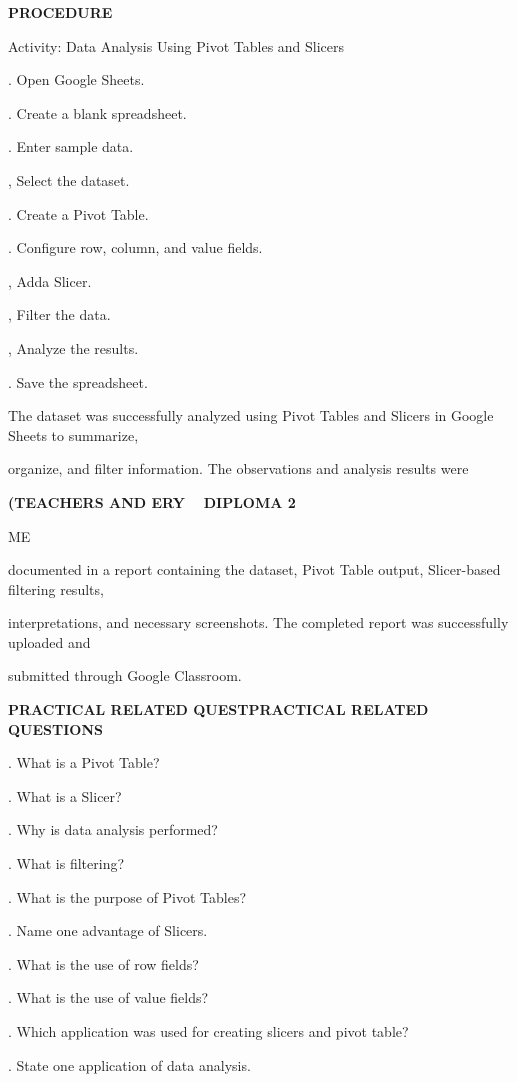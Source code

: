 \documentclass[10pt,a4paper]{article}
\begin{document}
\medskip\noindent\textbf{PROCEDURE}\par
\noindent Activity: Data Analysis Using Pivot Tables and Slicers\par
{}. Open Google Sheets.\par
{}. Create a blank spreadsheet.\par
{}. Enter sample data.\par
{}, Select the dataset.\par
{}. Create a Pivot Table.\par
{}. Configure row, column, and value fields.\par
{}, Adda Slicer.\par
{}, Filter the data.\par
{}, Analyze the results.\par
{}. Save the spreadsheet.\par
\noindent The dataset was successfully analyzed using Pivot Tables and Slicers in Google Sheets to summarize,\par
\noindent organize, and filter information. The observations and analysis results were\par
\medskip\noindent\textbf{(TEACHERS AND ERY ~ DIPLOMA 2}\par
\noindent ME\par
\noindent documented in a report containing the dataset, Pivot Table output, Slicer-based filtering results,\par
\noindent interpretations, and necessary screenshots. The completed report was successfully uploaded and\par
\noindent submitted through Google Classroom.\par
\clearpage
\medskip\noindent\textbf{PRACTICAL RELATED QUESTPRACTICAL RELATED QUESTIONS}\par
{}. What is a Pivot Table?\par
{}. What is a Slicer?\par
{}. Why is data analysis performed?\par
{}. What is filtering?\par
{}. What is the purpose of Pivot Tables?\par
{}. Name one advantage of Slicers.\par
{}. What is the use of row fields?\par
{}. What is the use of value fields?\par
{}. Which application was used for creating slicers and pivot table?\par
{}. State one application of data analysis.\par
\end{document}
